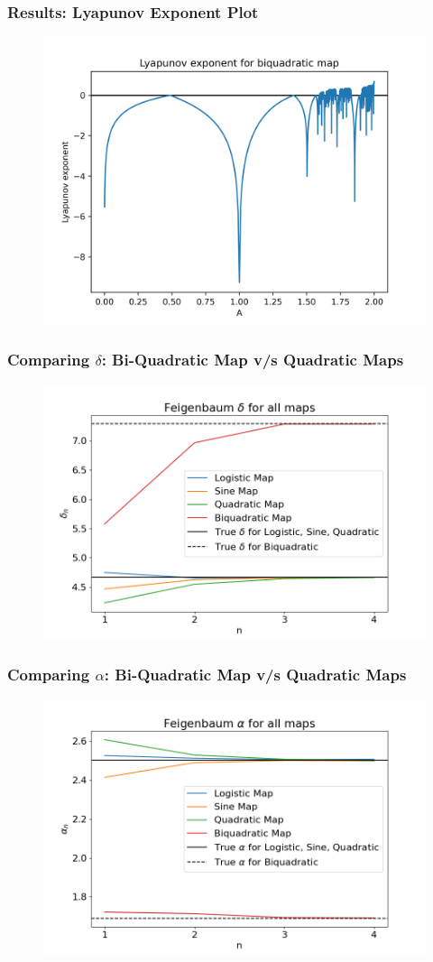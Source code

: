 \documentclass[
	11pt, %
	aspectratio=169, %
]{beamer}
\begin{document}

\begin{frame}
        \frametitle{Results: Lyapunov Exponent Plot}
        \begin{figure}
            \includegraphics[width=0.6\linewidth]
            {biquadratic_lyapunov_exp.png}
        \end{figure}
\end{frame}


\begin{frame}
        \frametitle{Comparing $\delta$: Bi-Quadratic Map v/s Quadratic Maps}
        \begin{figure}
            \includegraphics[width=0.6\linewidth]
            {feigenbaum_deltas.png}
        \end{figure}
\end{frame}


\begin{frame}
        \frametitle{Comparing $\alpha$: Bi-Quadratic Map v/s Quadratic Maps}
        \begin{figure}
            \includegraphics[width=0.6\linewidth]
            {feigenbaum_alphas.png}
        \end{figure}
\end{frame}
\end{document}

